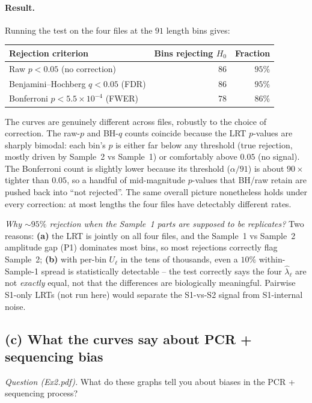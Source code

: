\documentclass[11pt,a4paper]{article}
\newcommand{\hlam}{\hat{\lambda}}
\begin{document}
\paragraph{Result.}
Running the test on the four files at the $91$ length bins gives:
\begin{center}
\renewcommand{\arraystretch}{1.15}
\begin{tabular}{lrr}
\textbf{Rejection criterion} & \textbf{Bins rejecting $H_0$} & \textbf{Fraction} \\\hline
Raw $p < 0.05$ (no correction)               & $86$ & $95\%$ \\
Benjamini--Hochberg $q < 0.05$ (FDR)         & $86$ & $95\%$ \\
Bonferroni $p < 5.5 \times 10^{-4}$ (FWER)   & $78$ & $86\%$ \\
\end{tabular}
\end{center}
The curves are genuinely different across files, robustly to the choice of
correction. The raw-$p$ and BH-$q$ counts coincide because the LRT $p$-values are
sharply bimodal: each bin's $p$ is either far below any threshold (true rejection,
mostly driven by Sample~2 vs Sample~1) or comfortably above $0.05$ (no signal).
The Bonferroni count is slightly lower because its threshold ($\alpha / 91$) is
about $90\times$ tighter than $0.05$, so a handful of mid-magnitude
$p$-values that BH/raw retain are pushed back into ``not rejected''. The same
overall picture nonetheless holds under every correction: at most lengths the four
files have detectably different rates.

\emph{Why $\sim 95\%$ rejection when the Sample~1 parts are supposed to be
replicates?} Two reasons: \textbf{(a)} the LRT is jointly on all four files,
and the Sample~1 vs Sample~2 amplitude gap (P1) dominates most bins, so most
rejections correctly flag Sample~2; \textbf{(b)} with per-bin $U_\ell$ in the
tens of thousands, even a $10\%$ within-Sample-1 spread is statistically
detectable -- the test correctly says the four $\hlam_\ell$ are not
\emph{exactly} equal, not that the differences are biologically meaningful.
Pairwise S1-only LRTs (not run here) would separate the S1-vs-S2 signal from
S1-internal noise.

\subsection{(c) What the curves say about PCR + sequencing bias}
\emph{Question (Ex2.pdf).} What do these graphs tell you about biases in the
PCR + sequencing process?
\end{document}
